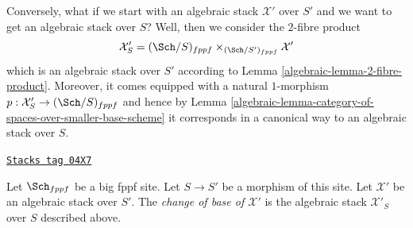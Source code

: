 Conversely, what if we start with an algebraic stack $\mathcal{X}'$
over $S'$ and we want to get an algebraic stack over $S$?
Well, then we consider the $2$-fibre product
$$
\mathcal{X}'_S
=
(\Sch/S)_{fppf} \times_{(\Sch/S')_{fppf}} \mathcal{X}'
$$
which is an algebraic stack over $S'$ according to
Lemma \ref{algebraic-lemma-2-fibre-product}.
Moreover, it comes equipped with a natural $1$-morphism
$p : \mathcal{X}'_S \to (\Sch/S)_{fppf}$ and hence by
Lemma \ref{algebraic-lemma-category-of-spaces-over-smaller-base-scheme}
it corresponds in a canonical way to an algebraic stack over $S$.

\begin{definition}
\label{algebraic-definition-change-of-base}
\href{https://stacks.math.columbia.edu/tag/04X7}{\texttt{Stacks tag 04X7}}

Let $\Sch_{fppf}$ be a big fppf site.
Let $S \to S'$ be a morphism of this site.
Let $\mathcal{X}'$ be an algebraic stack over $S'$.
The {\it change of base of $\mathcal{X}'$} is the
algebraic stack $\mathcal{X}'_S$ over $S$ described above.
\end{definition}



